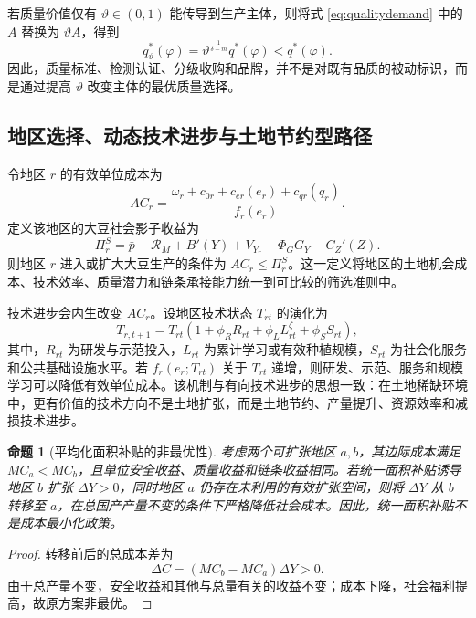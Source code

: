 \documentclass[UTF8,zihao=-4,fontset=fandol]{ctexart}
\numberwithin{equation}{section}
\newtheorem{proposition}{命题}
\theoremstyle{definition}
\theoremstyle{remark}
\begin{document}
若质量价值仅有 $\vartheta\in(0,1)$ 能传导到生产主体，则将式 \eqref{eq:qualitydemand} 中的 $A$ 替换为 $\vartheta A$，得到
\begin{equation}
 q^*_{\vartheta}(\varphi)=\vartheta^{\frac{1}{\delta-m}}q^*(\varphi)<q^*(\varphi).
 \label{eq:transmission}
\end{equation}
因此，质量标准、检测认证、分级收购和品牌，并不是对既有品质的被动标识，而是通过提高 $\vartheta$ 改变主体的最优质量选择。

\subsection{地区选择、动态技术进步与土地节约型路径}

令地区 $r$ 的有效单位成本为
\begin{equation}
 AC_r=\frac{\omega_r+c_{0r}+c_{er}(e_r)+c_{qr}(q_r)}{f_r(e_r)}.
 \label{eq:ACr}
\end{equation}
定义该地区的大豆社会影子收益为
\begin{equation}
 \Pi_r^{S}=\bar p+\mathcal{R}_M+B'(Y)+V_{Y_r}+\Phi_GG_Y-C_Z'(Z).
 \label{eq:regionbenefit}
\end{equation}
则地区 $r$ 进入或扩大大豆生产的条件为 $AC_r\leq\Pi_r^S$。这一定义将地区的土地机会成本、技术效率、质量潜力和链条承接能力统一到可比较的筛选准则中。

技术进步会内生改变 $AC_r$。设地区技术状态 $T_{rt}$ 的演化为
\begin{equation}
 T_{r,t+1}=T_{rt}\left(1+\phi_RR_{rt}+\phi_LL_{rt}^{\zeta}+\phi_SS_{rt}\right),
 \label{eq:dynamictech}
\end{equation}
其中，$R_{rt}$ 为研发与示范投入，$L_{rt}$ 为累计学习或有效种植规模，$S_{rt}$ 为社会化服务和公共基础设施水平。若 $f_r(e_r;T_{rt})$ 关于 $T_{rt}$ 递增，则研发、示范、服务和规模学习可以降低有效单位成本。该机制与有向技术进步的思想一致：在土地稀缺环境中，更有价值的技术方向不是土地扩张，而是土地节约、产量提升、资源效率和减损技术进步。

\begin{proposition}[平均化面积补贴的非最优性]
考虑两个可扩张地区 $a,b$，其边际成本满足 $MC_a<MC_b$，且单位安全收益、质量收益和链条收益相同。若统一面积补贴诱导地区 $b$ 扩张 $\Delta Y>0$，同时地区 $a$ 仍存在未利用的有效扩张空间，则将 $\Delta Y$ 从 $b$ 转移至 $a$，在总国产产量不变的条件下严格降低社会成本。因此，统一面积补贴不是成本最小化政策。
\end{proposition}

\begin{proof}
转移前后的总成本差为
\begin{equation}
 \Delta C=\left(MC_b-MC_a\right)\Delta Y>0.
\end{equation}
由于总产量不变，安全收益和其他与总量有关的收益不变；成本下降，社会福利提高，故原方案非最优。\end{proof}
\end{document}
